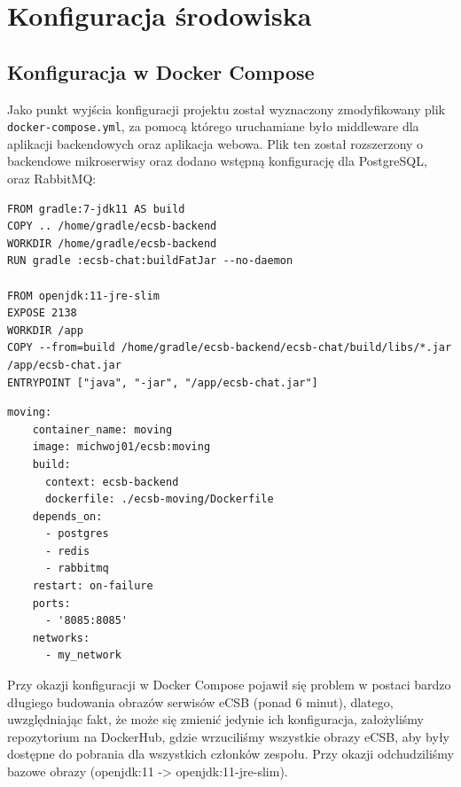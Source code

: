 \documentclass[polish]{aghengthesis}
\begin{document}
\chapter{Konfiguracja środowiska}
\label{sec:konfiguracja-srodowiska}

\section{Konfiguracja w Docker Compose}

Jako punkt wyjścia konfiguracji projektu został wyznaczony zmodyfikowany plik \texttt{docker-compose.yml}, za pomocą którego uruchamiane było middleware dla aplikacji backendowych oraz aplikacja webowa. Plik ten został rozszerzony o backendowe mikroserwisy oraz dodano wstępną konfigurację dla PostgreSQL, oraz RabbitMQ:

\begin{lstlisting}[caption=Przykład pliku Dockerfile dla mikroserwisu]
FROM gradle:7-jdk11 AS build
COPY .. /home/gradle/ecsb-backend
WORKDIR /home/gradle/ecsb-backend
RUN gradle :ecsb-chat:buildFatJar --no-daemon

FROM openjdk:11-jre-slim
EXPOSE 2138
WORKDIR /app
COPY --from=build /home/gradle/ecsb-backend/ecsb-chat/build/libs/*.jar /app/ecsb-chat.jar
ENTRYPOINT ["java", "-jar", "/app/ecsb-chat.jar"]
\end{lstlisting}

\begin{lstlisting}[caption=Przykładowa definicja kontenera mikroserwisu w pliku docker-compose.yml]
  moving:
    container_name: moving
    image: michwoj01/ecsb:moving
    build:
      context: ecsb-backend
      dockerfile: ./ecsb-moving/Dockerfile
    depends_on:
      - postgres
      - redis
      - rabbitmq
    restart: on-failure
    ports:
      - '8085:8085'
    networks:
      - my_network
\end{lstlisting}
\newpage

Przy okazji konfiguracji w Docker Compose pojawił się problem w postaci bardzo długiego budowania obrazów serwisów eCSB (ponad 6 minut), dlatego, uwzględniając fakt, że może się zmienić jedynie ich konfiguracja, założyliśmy repozytorium na DockerHub, gdzie wrzuciliśmy wszystkie obrazy eCSB, aby były dostępne do pobrania dla wszystkich członków zespołu. Przy okazji odchudziliśmy bazowe obrazy (openjdk:11 -> openjdk:11-jre-slim).
\end{document}
